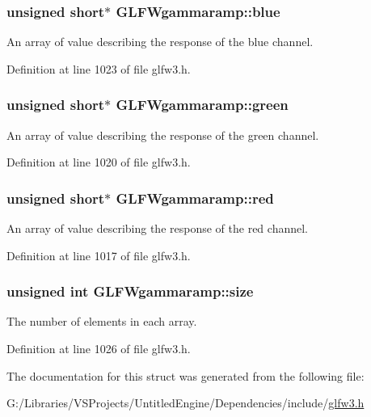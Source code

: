 \subsubsection[{blue}]{\setlength{\rightskip}{0pt plus 5cm}unsigned short$\ast$ G\+L\+F\+Wgammaramp\+::blue}\label{struct_g_l_f_wgammaramp_acf0c836d0efe29c392fe8d1a1042744b}
An array of value describing the response of the blue channel. 

Definition at line 1023 of file glfw3.\+h.

\hypertarget{struct_g_l_f_wgammaramp_affccc6f5df47820b6562d709da3a5a3a}{}
\subsubsection[{green}]{\setlength{\rightskip}{0pt plus 5cm}unsigned short$\ast$ G\+L\+F\+Wgammaramp\+::green}\label{struct_g_l_f_wgammaramp_affccc6f5df47820b6562d709da3a5a3a}
An array of value describing the response of the green channel. 

Definition at line 1020 of file glfw3.\+h.

\hypertarget{struct_g_l_f_wgammaramp_a2cce5d968734b685623eef913e635138}{}
\subsubsection[{red}]{\setlength{\rightskip}{0pt plus 5cm}unsigned short$\ast$ G\+L\+F\+Wgammaramp\+::red}\label{struct_g_l_f_wgammaramp_a2cce5d968734b685623eef913e635138}
An array of value describing the response of the red channel. 

Definition at line 1017 of file glfw3.\+h.

\hypertarget{struct_g_l_f_wgammaramp_ad620e1cffbff9a32c51bca46301b59a5}{}
\subsubsection[{size}]{\setlength{\rightskip}{0pt plus 5cm}unsigned {\bf int} G\+L\+F\+Wgammaramp\+::size}\label{struct_g_l_f_wgammaramp_ad620e1cffbff9a32c51bca46301b59a5}
The number of elements in each array. 

Definition at line 1026 of file glfw3.\+h.



The documentation for this struct was generated from the following file\+:\begin{DoxyCompactItemize}
\item 
G\+:/\+Libraries/\+V\+S\+Projects/\+Untitled\+Engine/\+Dependencies/include/\hyperlink{glfw3_8h}{glfw3.\+h}\end{DoxyCompactItemize}
